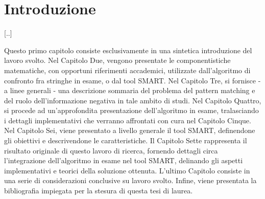 \section{Introduzione}

[..]

Questo primo capitolo consiste esclusivamente in una sintetica introduzione del lavoro svolto. Nel Capitolo Due, vengono presentate le componentistiche matematiche, con opportuni riferimenti accademici, utilizzate dall'algoritmo di confronto fra stringhe in esame, o dal tool SMART. Nel Capitolo Tre, si fornisce - a linee generali - una descrizione sommaria del problema del pattern matching e del ruolo dell'informazione negativa in tale ambito di studi.  Nel Capitolo Quattro, si procede ad un'approfondita presentazione dell'algoritmo in esame, tralasciando i dettagli implementativi che verranno affrontati con cura nel Capitolo Cinque. Nel Capitolo Sei, viene presentato a livello generale il tool SMART, definendone gli obiettivi e descrivendone le caratteristiche. Il Capitolo Sette rappresenta il risultato originale di questo lavoro di ricerca, fornendo dettagli circa l'integrazione dell'algoritmo in esame nel tool SMART, delinando gli aspetti implementativi e teorici della soluzione ottenuta. L'ultimo Capitolo consiste in una serie di considerazioni conclusive su lavoro svolto. Infine, viene presentata la bibliografia impiegata per la stesura di questa tesi di laurea.
